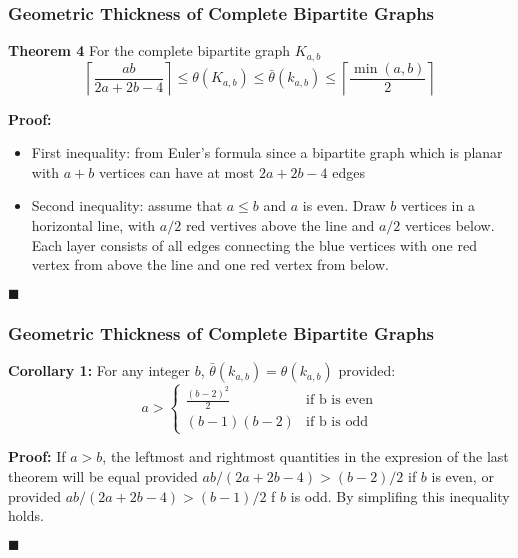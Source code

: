 \documentclass[12 pt]{beamer}
\begin{document}
\begin{frame}{}
    \frametitle{Geometric Thickness of Complete Bipartite Graphs}
    
    \begin{block}{\textbf{Theorem 4}}
    For the complete bipartite graph $K_{a, b}$
    $$\left \lceil \frac{ab}{2a + 2b - 4} \right \rceil \leq \theta (K_{a,b}) \leq \bar{\theta} (k_{a,b}) \leq \left \lceil \frac{\min(a, b)}{2}  \right \rceil$$
    \end{block}
    
    \pause
    
    \textbf{Proof:}
    \begin{itemize}
    \item First inequality: from Euler's formula since a bipartite graph which is planar with $a + b$ vertices can have at most $2a + 2b -4$ edges
    \item Second inequality: assume that $a \leq b$ and $a$ is even. Draw $b$ vertices in a horizontal line, with $a/2$ red vertives above the line and $a/2$ vertices below.
    Each layer consists of all edges connecting the blue vertices with one red vertex from above the line and one red vertex from below.
    \end{itemize}
    
    \begin{flushright}
    $\blacksquare$
    \end{flushright}
\end{frame}

\begin{frame}{}
    \frametitle{Geometric Thickness of Complete Bipartite Graphs}
    
    \begin{block}{\textbf{Corollary 1:}}
    For any integer $b$, $\bar{\theta} (k_{a,b}) = \theta (k_{a,b})$ provided:
    $$ a >
    \begin{cases}
    \frac{(b-2)^2}{2}  & \text{if b is even}\\
    (b-1)(b-2)  & \text{if b is odd}
    \end{cases}
    $$
    \end{block}
    
    \pause
    
    \textbf{Proof:}
    If $a > b$, the leftmost and rightmost quantities in the expresion of the last theorem will be equal provided $ab/(2a + 2b -4) > (b - 2)/2$ if $b$ is even, or provided  $ab/(2a + 2b -4) > (b - 1)/2$ f $b$ is odd. By simplifing this inequality holds.
    
    \begin{flushright}
    $\blacksquare$
    \end{flushright}
\end{frame}
\end{document}
